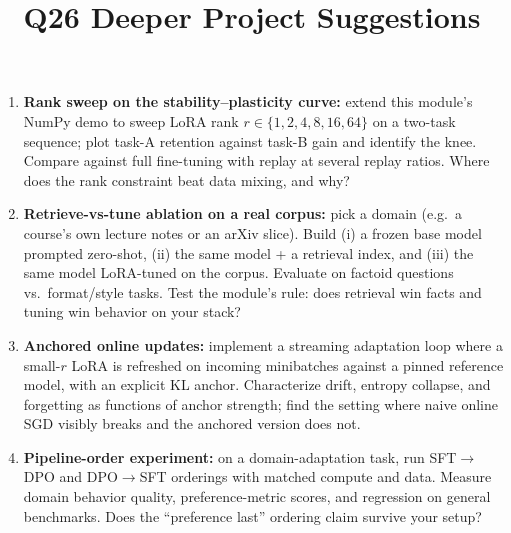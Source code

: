 \documentclass[11pt]{article}
\title{Q26 Deeper Project Suggestions}
\date{}
\begin{document}
\maketitle
\begin{enumerate}[noitemsep]
\item \textbf{Rank sweep on the stability--plasticity curve:} extend this module's NumPy demo to sweep LoRA rank $r \in \{1, 2, 4, 8, 16, 64\}$ on a two-task sequence; plot task-A retention against task-B gain and identify the knee. Compare against full fine-tuning with replay at several replay ratios. Where does the rank constraint beat data mixing, and why?
\item \textbf{Retrieve-vs-tune ablation on a real corpus:} pick a domain (e.g.\ a course's own lecture notes or an arXiv slice). Build (i) a frozen base model prompted zero-shot, (ii) the same model + a retrieval index, and (iii) the same model LoRA-tuned on the corpus. Evaluate on factoid questions vs.\ format/style tasks. Test the module's rule: does retrieval win facts and tuning win behavior on your stack?
\item \textbf{Anchored online updates:} implement a streaming adaptation loop where a small-$r$ LoRA is refreshed on incoming minibatches against a pinned reference model, with an explicit KL anchor. Characterize drift, entropy collapse, and forgetting as functions of anchor strength; find the setting where naive online SGD visibly breaks and the anchored version does not.
\item \textbf{Pipeline-order experiment:} on a domain-adaptation task, run SFT$\to$DPO and DPO$\to$SFT orderings with matched compute and data. Measure domain behavior quality, preference-metric scores, and regression on general benchmarks. Does the ``preference last'' ordering claim survive your setup?
\end{enumerate}
\end{document}

